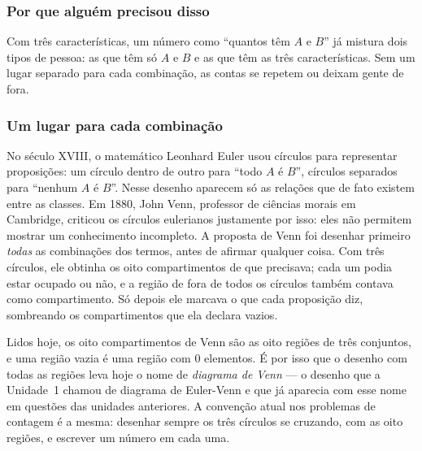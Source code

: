 \DeOndeVem

\subsubsection{Por que alguém precisou disso}
Com três características, um número como \enquote{quantos têm $A$ e $B$} já mistura dois tipos de pessoa: as que têm só $A$ e $B$ e as que têm as três características. Sem um lugar separado para cada combinação, as contas se repetem ou deixam gente de fora.

\subsubsection{Um lugar para cada combinação}
No século XVIII, o matemático Leonhard Euler usou círculos para representar proposições: um círculo dentro de outro para \enquote{todo $A$ é $B$}, círculos separados para \enquote{nenhum $A$ é $B$}. Nesse desenho aparecem só as relações que de fato existem entre as classes. Em 1880, John Venn, professor de ciências morais em Cambridge, criticou os círculos eulerianos justamente por isso: eles não permitem mostrar um conhecimento incompleto. A proposta de Venn foi desenhar primeiro \emph{todas} as combinações dos termos, antes de afirmar qualquer coisa. Com três círculos, ele obtinha os oito compartimentos de que precisava; cada um podia estar ocupado ou não, e a região de fora de todos os círculos também contava como compartimento. Só depois ele marcava o que cada proposição diz, sombreando os compartimentos que ela declara vazios.

Lidos hoje, os oito compartimentos de Venn são as oito regiões de três conjuntos, e uma região vazia é uma região com 0 elementos. É por isso que o desenho com todas as regiões leva hoje o nome de \emph{diagrama de Venn} — o desenho que a Unidade~1 chamou de diagrama de Euler-Venn e que já aparecia com esse nome em questões das unidades anteriores. A convenção atual nos problemas de contagem é a mesma: desenhar sempre os três círculos se cruzando, com as oito regiões, e escrever um número em cada uma.

